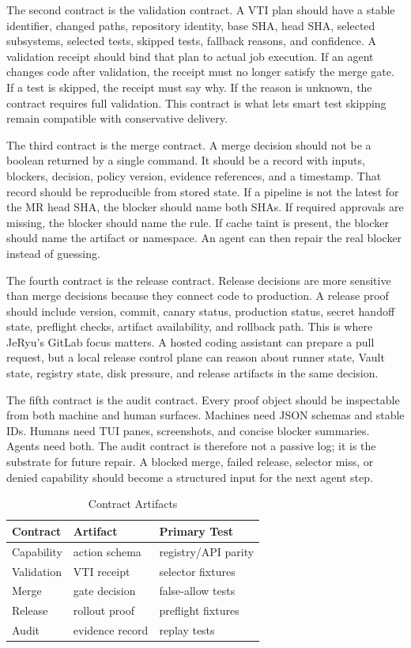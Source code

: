 \documentclass[conference]{IEEEtran}
\begin{document}
The second contract is the validation contract. A VTI plan should have a stable identifier, changed paths, repository identity, base SHA, head SHA, selected subsystems, selected tests, skipped tests, fallback reasons, and confidence. A validation receipt should bind that plan to actual job execution. If an agent changes code after validation, the receipt must no longer satisfy the merge gate. If a test is skipped, the receipt must say why. If the reason is unknown, the contract requires full validation. This contract is what lets smart test skipping remain compatible with conservative delivery.

The third contract is the merge contract. A merge decision should not be a boolean returned by a single command. It should be a record with inputs, blockers, decision, policy version, evidence references, and a timestamp. That record should be reproducible from stored state. If a pipeline is not the latest for the MR head SHA, the blocker should name both SHAs. If required approvals are missing, the blocker should name the rule. If cache taint is present, the blocker should name the artifact or namespace. An agent can then repair the real blocker instead of guessing.

The fourth contract is the release contract. Release decisions are more sensitive than merge decisions because they connect code to production. A release proof should include version, commit, canary status, production status, secret handoff state, preflight checks, artifact availability, and rollback path. This is where JeRyu's GitLab focus matters. A hosted coding assistant can prepare a pull request, but a local release control plane can reason about runner state, Vault state, registry state, disk pressure, and release artifacts in the same decision.

The fifth contract is the audit contract. Every proof object should be inspectable from both machine and human surfaces. Machines need JSON schemas and stable IDs. Humans need TUI panes, screenshots, and concise blocker summaries. Agents need both. The audit contract is therefore not a passive log; it is the substrate for future repair. A blocked merge, failed release, selector miss, or denied capability should become a structured input for the next agent step.

\begin{table}[t]
\caption{Contract Artifacts}
\centering
\begin{tabular}{lll}
\toprule
Contract & Artifact & Primary Test\\
\midrule
Capability & action schema & registry/API parity\\
Validation & VTI receipt & selector fixtures\\
Merge & gate decision & false-allow tests\\
Release & rollout proof & preflight fixtures\\
Audit & evidence record & replay tests\\
\bottomrule
\end{tabular}
\end{table}
\end{document}
